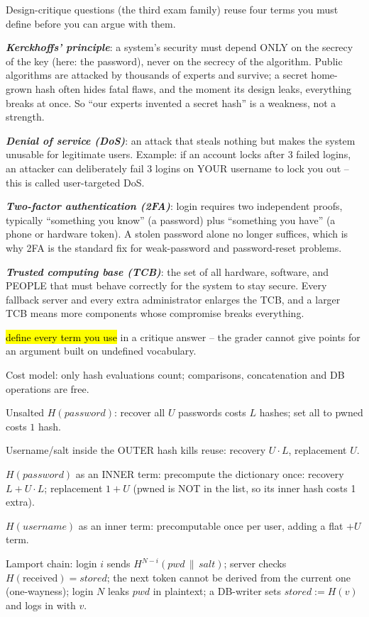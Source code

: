 \documentclass[12pt, a4paper]{article}
\newcommand{\term}[1]{\textbf{\textit{#1}}}        %
\newcommand{\imp}[1]{\hl{#1}}                       %
\begin{document}
Design-critique questions (the third exam family) reuse four terms you must define before you can argue with them.
\begin{tightitem}
    \item \term{Kerckhoffs' principle}: a system's security must depend ONLY on the secrecy of the key (here: the password), never on the secrecy of the algorithm.
    Public algorithms are attacked by thousands of experts and survive; a secret home-grown hash often hides fatal flaws, and the moment its design leaks, everything breaks at once. So ``our experts invented a secret hash'' is a weakness, not a strength.
    \item \term{Denial of service (DoS)}: an attack that steals nothing but makes the system unusable for legitimate users. Example: if an account locks after 3 failed logins, an attacker can deliberately fail 3 logins on YOUR username to lock you out -- this is called user-targeted DoS.
    \item \term{Two-factor authentication (2FA)}: login requires two independent proofs, typically ``something you know'' (a password) plus ``something you have'' (a phone or hardware token). A stolen password alone no longer suffices, which is why 2FA is the standard fix for weak-password and password-reset problems.
    \item \term{Trusted computing base (TCB)}: the set of all hardware, software, and PEOPLE that must behave correctly for the system to stay secure. Every fallback server and every extra administrator enlarges the TCB, and a larger TCB means more components whose compromise breaks everything.
\end{tightitem}
\imp{define every term you use} in a critique answer -- the grader cannot give points for an argument built on undefined vocabulary.

\begin{theorybox}
\begin{tightitem}
    \item Cost model: only hash evaluations count; comparisons, concatenation and DB operations are free.
    \item Unsalted $H(password)$: recover all $U$ passwords costs $L$ hashes; set all to pwned costs $1$ hash.
    \item Username/salt inside the OUTER hash kills reuse: recovery $U \cdot L$, replacement $U$.
    \item $H(password)$ as an INNER term: precompute the dictionary once: recovery $L + U \cdot L$; replacement $1 + U$ (pwned is NOT in the list, so its inner hash costs 1 extra).
    \item $H(username)$ as an inner term: precomputable once per user, adding a flat $+U$ term.
    \item Lamport chain: login $i$ sends $H^{N-i}(pwd \,\|\, salt)$; server checks $H(\text{received}) = stored$; the next token cannot be derived from the current one (one-wayness); login $N$ leaks $pwd$ in plaintext; a DB-writer sets $stored := H(v)$ and logs in with $v$.
\end{tightitem}
\end{theorybox}
\end{document}
